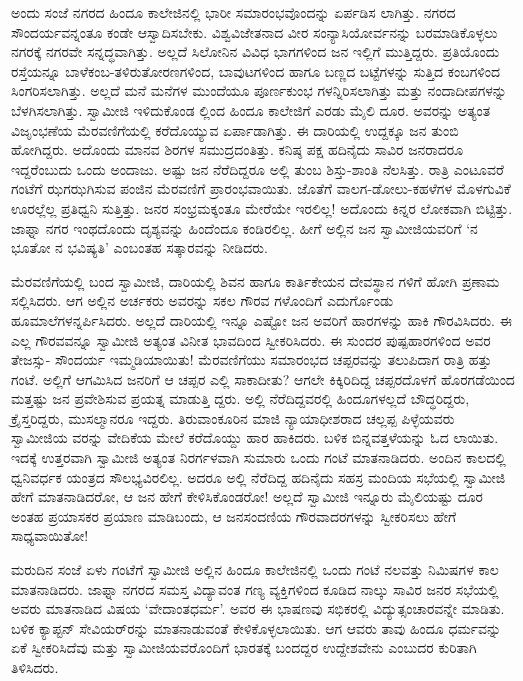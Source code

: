 ಅಂದು ಸಂಜೆ ನಗರದ ಹಿಂದೂ ಕಾಲೇಜಿನಲ್ಲಿ ಭಾರೀ ಸಮಾರಂಭವೊಂದನ್ನು ಏರ್ಪಡಿಸ ಲಾಗಿತ್ತು. ನಗರದ ಸೌಂದರ್ಯವನ್ನಂತೂ ಕಂಡೇ ಆಸ್ವಾದಿಸಬೇಕು. ವಿಶ್ವವಿಜೇತನಾದ ವೀರ ಸಂನ್ಯಾಸಿಯೋರ್ವನನ್ನು ಬರಮಾಡಿಕೊಳ್ಳಲು ನಗರಕ್ಕೆ ನಗರವೇ ಸನ್ನದ್ಧವಾಗಿತ್ತು. ಅಲ್ಲದೆ ಸಿಲೋನಿನ ವಿವಿಧ ಭಾಗಗಳಿಂದ ಜನ ಇಲ್ಲಿಗೆ ಮುತ್ತಿದ್ದರು. ಪ್ರತಿಯೊಂದು ರಸ್ತೆಯನ್ನೂ ಬಾಳೆಕಂಬ-ತಳಿರುತೋರಣಗಳಿಂದ, ಬಾವುಟಗಳಿಂದ ಹಾಗೂ ಬಣ್ಣದ ಬಟ್ಟೆಗಳನ್ನು ಸುತ್ತಿದ ಕಂಬಗಳಿಂದ ಸಿಂಗರಿಸಲಾಗಿತ್ತು. ಅಲ್ಲದೆ ಮನೆ ಮನೆಗಳ ಮುಂದೆಯೂ ಪೂರ್ಣಕುಂಭ ಗಳನ್ನಿರಿಸಲಾಗಿತ್ತು ಮತ್ತು ನಂದಾದೀಪಗಳನ್ನು ಬೆಳಗಿಸಲಾಗಿತ್ತು. ಸ್ವಾಮೀಜಿ ಇಳಿದುಕೊಂಡ ಲ್ಲಿಂದ ಹಿಂದೂ ಕಾಲೇಜಿಗೆ ಎರಡು ಮೈಲಿ ದೂರ. ಅವರನ್ನು ಅತ್ಯಂತ ವಿಜೃಂಭಣೆಯ ಮೆರವಣಿಗೆಯಲ್ಲಿ ಕರೆದೊಯ್ಯುವ ಏರ್ಪಾಡಾಗಿತ್ತು. ಈ ದಾರಿಯಲ್ಲಿ ಉದ್ದಕ್ಕೂ ಜನ ತುಂಬಿ ಹೋಗಿದ್ದರು. ಅದೊಂದು ಮಾನವ ಶಿರಗಳ ಸಮುದ್ರದಂತಿತ್ತು. ಕನಿಷ್ಠ ಪಕ್ಷ ಹದಿನೈದು ಸಾವಿರ ಜನರಾದರೂ ಇದ್ದರೆಂಬುದು ಒಂದು ಅಂದಾಜು. ಅಷ್ಟು ಜನ ನೆರೆದಿದ್ದರೂ ಅಲ್ಲಿ ತುಂಬ ಶಿಸ್ತು-ಶಾಂತಿ ನೆಲಸಿತ್ತು. ರಾತ್ರಿ ಎಂಟೂವರೆ ಗಂಟೆಗೆ ಝಗಝಗಿಸುವ ಪಂಜಿನ ಮೆರವಣಿಗೆ ಪ್ರಾರಂಭವಾಯಿತು. ಜೊತೆಗೆ ವಾಲಗ-ಡೋಲು-ಕಹಳೆಗಳ ಮೊಳಗುವಿಕೆ ಊರಲ್ಲೆಲ್ಲ ಪ್ರತಿಧ್ವನಿ ಸುತ್ತಿತ್ತು. ಜನರ ಸಂಭ್ರಮಕ್ಕಂತೂ ಮೇರೆಯೇ ಇರಲಿಲ್ಲ! ಅದೊಂದು ಕಿನ್ನರ ಲೋಕವಾಗಿ ಬಿಟ್ಟಿತ್ತು. ಜಾಫ್ನಾ ನಗರ ಇಂಥದೊಂದು ದೃಶ್ಯವನ್ನು ಹಿಂದೆಂದೂ ಕಂಡಿರಲಿಲ್ಲ. ಹೀಗೆ ಅಲ್ಲಿನ ಜನ ಸ್ವಾಮೀಜಿಯವರಿಗೆ ‘ನ ಭೂತೋ ನ ಭವಿಷ್ಯತಿ’ ಎಂಬಂತಹ ಸತ್ಕಾರವನ್ನು ನೀಡಿದರು. 

ಮೆರವಣಿಗೆಯಲ್ಲಿ ಬಂದ ಸ್ವಾಮೀಜಿ, ದಾರಿಯಲ್ಲಿ ಶಿವನ ಹಾಗೂ ಕಾರ್ತಿಕೇಯನ ದೇವಸ್ಥಾನ ಗಳಿಗೆ ಹೋಗಿ ಪ್ರಣಾಮ ಸಲ್ಲಿಸಿದರು. ಆಗ ಅಲ್ಲಿನ ಅರ್ಚಕರು ಅವರನ್ನು ಸಕಲ ಗೌರವ ಗಳೊಂದಿಗೆ ಎದುರ್ಗೊಂಡು ಹೂಮಾಲೆಗಳನ್ನರ್ಪಿಸಿದರು. ಅಲ್ಲದೆ ದಾರಿಯಲ್ಲಿ ಇನ್ನೂ ಎಷ್ಟೋ ಜನ ಅವರಿಗೆ ಹಾರಗಳನ್ನು ಹಾಕಿ ಗೌರವಿಸಿದರು. ಈ ಎಲ್ಲ ಗೌರವವನ್ನೂ ಸ್ವಾಮೀಜಿ ಅತ್ಯಂತ ವಿನೀತ ಭಾವದಿಂದ ಸ್ವೀಕರಿಸಿದರು. ಈ ಸುಂದರ ಪುಷ್ಪಹಾರಗಳಿಂದ ಅವರ ತೇಜಸ್ಸು- ಸೌಂದರ್ಯ ಇಮ್ಮಡಿಯಾಯಿತು! ಮೆರವಣಿಗೆಯು ಸಮಾರಂಭದ ಚಪ್ಪರವನ್ನು ತಲುಪಿದಾಗ ರಾತ್ರಿ ಹತ್ತು ಗಂಟೆ. ಅಲ್ಲಿಗೆ ಆಗಮಿಸಿದ ಜನರಿಗೆ ಆ ಚಪ್ಪರ ಎಲ್ಲಿ ಸಾಕಾದೀತು? ಆಗಲೇ ಕಿಕ್ಕಿರಿದಿದ್ದ ಚಪ್ಪರದೊಳಗೆ ಹೊರಗಡೆಯಿಂದ ಮತ್ತಷ್ಟು ಜನ ಪ್ರವೇಶಿಸುವ ಪ್ರಯತ್ನ ಮಾಡುತ್ತಿ ದ್ದರು. ಅಲ್ಲಿ ನೆರೆದಿದ್ದವರಲ್ಲಿ ಹಿಂದೂಗಳಲ್ಲದೆ ಬೌದ್ಧರಿದ್ದರು, ಕ್ರೈಸ್ತರಿದ್ದರು, ಮುಸಲ್ಮಾನರೂ ಇದ್ದರು. ತಿರುವಾಂಕೂರಿನ ಮಾಜಿ ನ್ಯಾಯಾಧೀಶರಾದ ಚಲ್ಲಪ್ಪ ಪಿಳ್ಳೆಯವರು ಸ್ವಾಮೀಜಿಯ ವರನ್ನು ವೇದಿಕೆಯ ಮೇಲೆ ಕರೆದೊಯ್ದು ಹಾರ ಹಾಕಿದರು. ಬಳಿಕ ಬಿನ್ನವತ್ತಳೆಯನ್ನು ಓದ ಲಾಯಿತು. ಇದಕ್ಕೆ ಉತ್ತರವಾಗಿ ಸ್ವಾಮೀಜಿ ಅತ್ಯಂತ ನಿರರ್ಗಳವಾಗಿ ಸುಮಾರು ಒಂದು ಗಂಟೆ ಮಾತನಾಡಿದರು. ಅಂದಿನ ಕಾಲದಲ್ಲಿ ಧ್ವನಿವರ್ಧಕ ಯಂತ್ರದ ಸೌಲಭ್ಯವಿರಲಿಲ್ಲ. ಅದರೂ ಅಲ್ಲಿ ನೆರೆದಿದ್ದ ಹದಿನೈದು ಸಹಸ್ರ ಮಂದಿಯ ಸಭೆಯಲ್ಲಿ ಸ್ವಾಮೀಜಿ ಹೇಗೆ ಮಾತನಾಡಿದರೋ, ಆ ಜನ ಹೇಗೆ ಕೇಳಿಸಿಕೊಂಡರೋ! ಅಲ್ಲದೆ ಸ್ವಾಮೀಜಿ ಇನ್ನೂರು ಮೈಲಿಯಷ್ಟು ದೂರ ಅಂತಹ ಪ್ರಯಾಸಕರ ಪ್ರಯಾಣ ಮಾಡಿಬಂದು, ಆ ಜನಸಂದಣಿಯ ಗೌರವಾದರಗಳನ್ನು ಸ್ವೀಕರಿಸಲು ಹೇಗೆ ಸಾಧ್ಯವಾಯಿತೋ!

ಮರುದಿನ ಸಂಜೆ ಏಳು ಗಂಟೆಗೆ ಸ್ವಾಮೀಜಿ ಅಲ್ಲಿನ ಹಿಂದೂ ಕಾಲೇಜಿನಲ್ಲಿ ಒಂದು ಗಂಟೆ ನಲವತ್ತು ನಿಮಿಷಗಳ ಕಾಲ ಮಾತನಾಡಿದರು. ಜಾಫ್ನಾ ನಗರದ ಸಮಸ್ತ ವಿದ್ಯಾವಂತ ಗಣ್ಯ ವ್ಯಕ್ತಿಗಳಿಂದ ಕೂಡಿದ ನಾಲ್ಕು ಸಾವಿರ ಜನರ ಸಭೆಯಲ್ಲಿ ಅವರು ಮಾತನಾಡಿದ ವಿಷಯ ‘ವೇದಾಂತಧರ್ಮ’. ಅವರ ಈ ಭಾಷಣವು ಸಭಿಕರಲ್ಲಿ ವಿದ್ಯುತ್ಸಂಚಾರವನ್ನೇ ಮಾಡಿತು. ಬಳಿಕ ಕ್ಯಾಪ್ಟನ್ ಸೇವಿಯರ್​ರನ್ನು ಮಾತನಾಡುವಂತೆ ಕೇಳಿಕೊಳ್ಳಲಾಯಿತು. ಆಗ ಆವರು ತಾವು ಹಿಂದೂ ಧರ್ಮವನ್ನು ಏಕೆ ಸ್ವೀಕರಿಸಿದೆವು ಮತ್ತು ಸ್ವಾಮೀಜಿಯವರೊಂದಿಗೆ ಭಾರತಕ್ಕೆ ಬಂದದ್ದರ ಉದ್ದೇಶವೇನು ಎಂಬುದರ ಕುರಿತಾಗಿ ತಿಳಿಸಿದರು.

